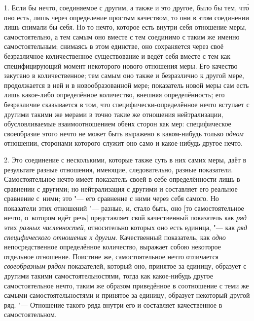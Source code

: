 1. Если бы нечто, соединяемое с другим, а также и это другое, было бы тем,
чт\'{о} оно есть, лишь через определение простым качеством, то они в этом
соединении лишь снимали бы себя. Но то нечто, которое есть внутри себя
отношение меры, самостоятельно, а тем самым оно вместе с тем соединимо с таким
же именно самостоятельным; снимаясь в этом единстве, оно сохраняется через своё
безразличное количественное существование и ведёт себя вместе с тем как
специфицирующий момент некоторого нового отношения меры. Его качество закутано
в количественное; тем самым оно также и безразлично к другой мере, продолжается
в ней и в новообразованной мере; показатель новой меры сам есть лишь какое-либо
определённое количество, внешняя определённость; его безразличие сказывается в
том, что специфически-определённое нечто вступает с другими такими же мерами в
точно такие же отношения нейтрализации, обусловливаемые взаимоотношением обеих
сторон как мер: специфическое своеобразие этого нечто не может быть выражено в
каком-нибудь только {\em одном} отношении, сторонами которого служит оно само и
какое-нибудь другое нечто.

2. Это соединение с несколькими, которые также суть в них самих меры, даёт в
результате разные отношения, имеющие, следовательно, разные показатели.
Самостоятельное нечто имеет показатель своей в-себе-определённости лишь в
сравнении с другими; но нейтрализация с другими и составляет его реальное
сравнение с~ними; это "--- его сравнение с ними через себя самого. Но
показатели этих отношений "--- разные, и, стало быть, оно [то самостоятельное
нечто, о~котором идёт речь] представляет свой качественный показатель как
{\em ряд} этих {\em разных численностей,} относительно которых оно есть
единица, "--- как {\em ряд специфического отношения к другим}. Качественный
показатель, как {\em одно} непосредственное определённое количество, выражает
собою некоторое отдельное отношение. Поистине же, самостоятельное нечто
отличается {\em своеобразным рядом} показателей, который оно, принятое за
единицу, образует с другими такими самостоятельностями, тогда как какое-нибудь
другое самостоятельное нечто, таким же образом приведённое в соотношение с теми
же самыми самостоятельностями и принятое за единицу, образует некоторый другой
ряд. "--- Отношение такого ряда внутри его и составляет качественное в
самостоятельном.

